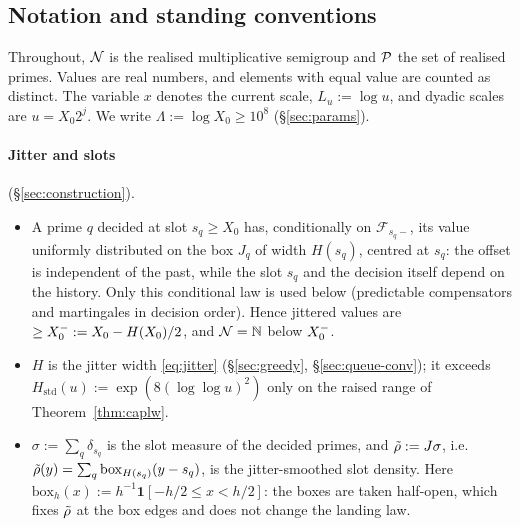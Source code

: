 \subsection{Notation and standing conventions}\label{sec:noise-notation}

Throughout, $\mathcal{N}$ is the realised multiplicative semigroup and $\mathcal{P}$ the set of realised primes. Values are real
numbers, and elements with equal value are counted as distinct. The variable $x$ denotes the current scale,
$L_u:=\log u$, and dyadic scales are $u=X_0 2^j$. We write $\Lambda:=\log X_0\ge 10^8$ (\S\ref{sec:params}).

\paragraph{Jitter and slots} (\S\ref{sec:construction}).
\begin{itemize}
\item A prime $q$ decided at slot $s_q\ge X_0$ has, conditionally on $\mathcal F_{s_q-}$, its value uniformly distributed on
  the box $J_q$ of width $H(s_q)$, centred at $s_q$: the offset is independent of the past, while the slot $s_q$ and the
  decision itself depend on the history. Only this conditional law is used below (predictable compensators and
  martingales in decision order). Hence jittered values are $\ge X_0^{-}:=X_0-H(X_0)/2$, and $\mathcal{N}=\mathbb{N}$ below $X_0^{-}$.
\item $H$ is the jitter width \eqref{eq:jitter} (\S\ref{sec:greedy}, \S\ref{sec:queue-conv}); it exceeds
  $H_{\mathrm{std}}(u):=\exp(8(\log\log u)^2)$ only on the raised range of Theorem~\ref{thm:caplw}.
\item $\sigma:=\sum_q\delta_{s_q}$ is the slot measure of the decided primes, and
  $\tilde\rho:=J\sigma$, i.e.\ $\tilde\rho(y)=\sum_q \mathrm{box}_{H(s_q)}(y-s_q)$, is the jitter-smoothed slot density. Here
  $\mathrm{box}_h(x):=h^{-1}\mathbf 1[-h/2\le x<h/2]$: the boxes are taken half-open, which fixes $\tilde\rho$ at the box edges and
  does not change the landing law.
\end{itemize}

